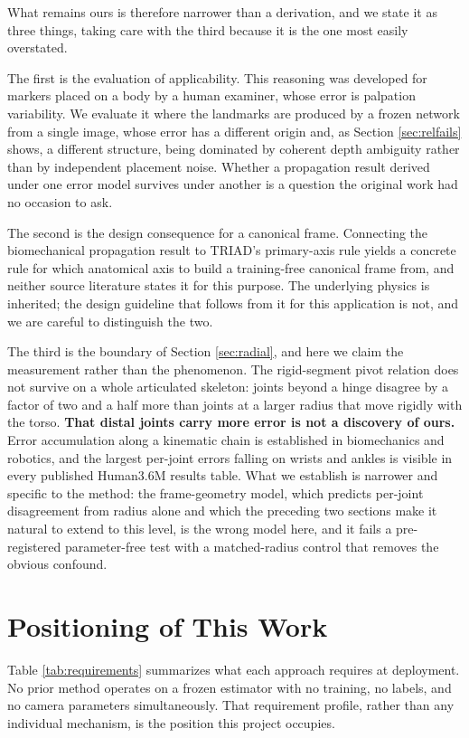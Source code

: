 \documentclass[12pt,a4paper]{report}
\begin{document}
What remains ours is therefore narrower than a derivation, and we state it as three things, taking care with the third because it is the one most easily overstated.

The first is the evaluation of applicability. This reasoning was developed for markers placed on a body by a human examiner, whose error is palpation variability. We evaluate it where the landmarks are produced by a frozen network from a single image, whose error has a different origin and, as Section \ref{sec:relfails} shows, a different structure, being dominated by coherent depth ambiguity rather than by independent placement noise. Whether a propagation result derived under one error model survives under another is a question the original work had no occasion to ask.

The second is the design consequence for a canonical frame. Connecting the biomechanical propagation result to TRIAD's primary-axis rule yields a concrete rule for which anatomical axis to build a training-free canonical frame from, and neither source literature states it for this purpose. The underlying physics is inherited; the design guideline that follows from it for this application is not, and we are careful to distinguish the two.

The third is the boundary of Section \ref{sec:radial}, and here we claim the measurement rather than the phenomenon. The rigid-segment pivot relation does not survive on a whole articulated skeleton: joints beyond a hinge disagree by a factor of two and a half more than joints at a larger radius that move rigidly with the torso. \textbf{That distal joints carry more error is not a discovery of ours.} Error accumulation along a kinematic chain is established in biomechanics and robotics, and the largest per-joint errors falling on wrists and ankles is visible in every published Human3.6M results table. What we establish is narrower and specific to the method: the frame-geometry model, which predicts per-joint disagreement from radius alone and which the preceding two sections make it natural to extend to this level, is the wrong model here, and it fails a pre-registered parameter-free test with a matched-radius control that removes the obvious confound.

\section{Positioning of This Work}

Table \ref{tab:requirements} summarizes what each approach requires at deployment. No prior method operates on a frozen estimator with no training, no labels, and no camera parameters simultaneously. That requirement profile, rather than any individual mechanism, is the position this project occupies.
\end{document}
